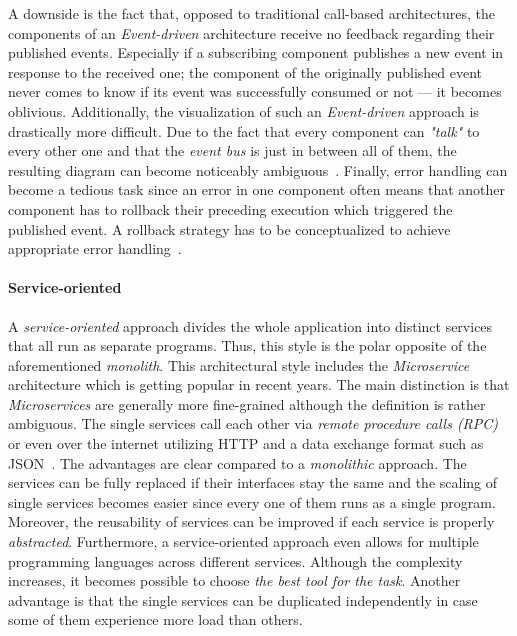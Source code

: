 \documentclass[12pt,a4paper,twoside]{report}
\begin{document}
A downside is the fact that, opposed to traditional call-based architectures,
the components of an \textit{Event-driven} architecture receive no feedback regarding
their published events. Especially if a subscribing component publishes a new event
in response to the received one; the component of the originally published
event never comes to know if its event was successfully consumed or not ---
it becomes oblivious.
Additionally, the visualization of such an \textit{Event-driven} approach
is drastically more difficult. Due to the fact that every component can
\textit{"talk"} to every other one and that the \textit{event bus} is just in between
all of them, the resulting diagram can become noticeably ambiguous~\cite{fairbanks-sa}.
Finally, error handling can become a tedious task since an error in one component
often means that another component has to rollback their preceding execution which
triggered the published event. A rollback strategy has to be conceptualized to
achieve appropriate error handling~\cite{richards-sa-patterns}.

\paragraph{Service-oriented} \label{para:service-oriented}
A \textit{service-oriented} approach divides the whole application into distinct
services that all run as separate programs. Thus, this style is the
polar opposite of the aforementioned \textit{monolith}.
This architectural style includes the \textit{Microservice} architecture
which is getting popular in recent years. The main distinction is that
\textit{Microservices} are generally more fine-grained although the definition
is rather ambiguous.
The single services call each other via
\textit{remote procedure calls (RPC)} or even over the internet utilizing HTTP
and a data exchange format such as JSON~\cite{ms-microservices}.
The advantages are clear compared to a \textit{monolithic} approach.
The services can be fully replaced if their interfaces stay the same and the
scaling of single services becomes easier since every one of them runs as a single program.
Moreover, the reusability of services can be improved if each service is properly \textit{abstracted}.
Furthermore, a service-oriented approach even allows for multiple programming languages
across different services. Although the complexity increases, it becomes possible
to choose \textit{the best tool for the task}.
Another advantage is that the single services can be duplicated independently
in case some of them experience more load than others.
\end{document}
